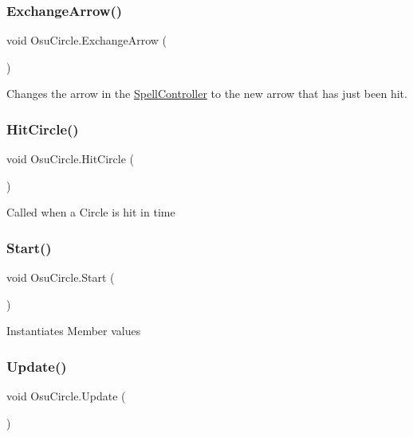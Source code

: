 \subsubsection{\texorpdfstring{Exchange\+Arrow()}{ExchangeArrow()}}
{\footnotesize\ttfamily void Osu\+Circle.\+Exchange\+Arrow (\begin{DoxyParamCaption}{ }\end{DoxyParamCaption})}

Changes the arrow in the \hyperlink{class_spell_controller}{Spell\+Controller} to the new arrow that has just been hit. \mbox{\label{class_osu_circle_ac1bcc007ef49c6e9de959168eea7bca4}} 
\subsubsection{\texorpdfstring{Hit\+Circle()}{HitCircle()}}
{\footnotesize\ttfamily void Osu\+Circle.\+Hit\+Circle (\begin{DoxyParamCaption}{ }\end{DoxyParamCaption})}

Called when a Circle is hit in time \mbox{\label{class_osu_circle_ad681160a65a26c66917d2264c3a4d23c}} 
\subsubsection{\texorpdfstring{Start()}{Start()}}
{\footnotesize\ttfamily void Osu\+Circle.\+Start (\begin{DoxyParamCaption}{ }\end{DoxyParamCaption})\hspace{0.3cm}{\ttfamily [private]}}

Instantiates Member values \mbox{\label{class_osu_circle_afe2813ce3da745f0e5a43aafad6fb419}} 
\subsubsection{\texorpdfstring{Update()}{Update()}}
{\footnotesize\ttfamily void Osu\+Circle.\+Update (\begin{DoxyParamCaption}{ }\end{DoxyParamCaption})\hspace{0.3cm}{\ttfamily [private]}}

